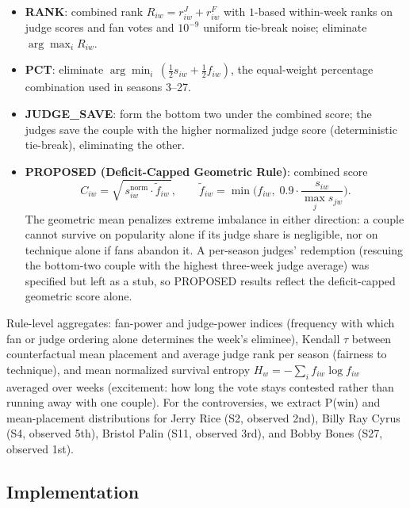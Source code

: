 \documentclass[11pt]{article}
\begin{document}
\begin{itemize}
\item \textbf{RANK}: combined rank $R_{iw} = r^{J}_{iw} + r^{F}_{iw}$
with $1$-based within-week ranks on judge scores and fan votes and
$10^{-9}$ uniform tie-break noise; eliminate $\arg\max_i R_{iw}$.
\item \textbf{PCT}: eliminate $\arg\min_i \, (\tfrac12 s_{iw} + \tfrac12 f_{iw})$,
the equal-weight percentage combination used in seasons 3--27.
\item \textbf{JUDGE\_SAVE}: form the bottom two under the combined score;
the judges save the couple with the higher normalized judge score
(deterministic tie-break), eliminating the other.
\item \textbf{PROPOSED (Deficit-Capped Geometric Rule)}: combined score
\begin{equation}
C_{iw} = \sqrt{\, s^{\text{norm}}_{iw} \cdot \tilde{f}_{iw}\,},
\qquad
\tilde{f}_{iw} = \min\!\Big(f_{iw},\; 0.9 \cdot \frac{s_{iw}}{\max_j s_{jw}}\Big).
\label{eq:proposed}
\end{equation}
The geometric mean penalizes extreme imbalance in either direction: a
couple cannot survive on popularity alone if its judge share is
negligible, nor on technique alone if fans abandon it. A per-season
judges' redemption (rescuing the bottom-two couple with the highest
three-week judge average) was specified but left as a stub, so PROPOSED
results reflect the deficit-capped geometric score alone.
\end{itemize}

Rule-level aggregates: fan-power and judge-power indices
(frequency with which fan or judge ordering alone determines the
week's eliminee), Kendall $\tau$ between counterfactual mean placement
and average judge rank per season (fairness to technique), and mean
normalized survival entropy
$H_w = -\sum_i f_{iw} \log f_{iw}$ averaged over weeks (excitement: how
long the vote stays contested rather than running away with one couple).
For the controversies, we extract P(win) and mean-placement
distributions for Jerry Rice (S2, observed 2nd), Billy Ray Cyrus (S4,
observed 5th), Bristol Palin (S11, observed 3rd), and Bobby Bones (S27,
observed 1st).

\subsection{Implementation}
\end{document}

